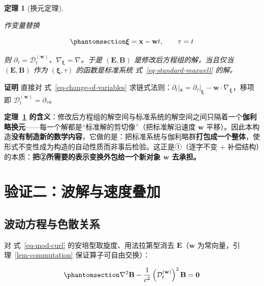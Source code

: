 \documentclass[
  chinese,
  a4paper,
  UTF8,
  12pt,
  oneside,
  openany]{ctexbook}
\theoremstyle{plain}
\newtheorem{theorem}{定理}[chapter]
\theoremstyle{plain}
\theoremstyle{plain}
\theoremstyle{definition}
\theoremstyle{plain}
\theoremstyle{plain}
\theoremstyle{remark}
\begin{document}
\begin{theorem}[换元定理]\protect\hypertarget{thm-change-of-variables}{}\label{thm-change-of-variables}

作变量替换

\begin{equation}\protect\phantomsection\label{eq-change-of-variables}{
\boldsymbol{\xi} = \mathbf{x} - \mathbf{w}t,
\qquad
\tau = t
}\end{equation}

则
\(\partial_{\tau} = \mathcal{D}_{t}^{(\mathbf{w})}\)、\(\nabla_{\boldsymbol{\xi}} = \nabla\)。于是
\(\left(\mathbf{E},\mathbf{B}\right)\) 是修改后方程组的解，当且仅当
\(\left(\mathbf{E},\mathbf{B}\right)\) 作为
\(\left(\boldsymbol{\xi},\tau\right)\) 的函数是标准系统
式~\ref{eq-standard-maxwell} 的解。

\end{theorem}

\textbf{证明} 直接对 式~\ref{eq-change-of-variables}
求链式法则：\(\partial_t|_{\mathbf{x}} = \partial_{\tau}|_{\boldsymbol{\xi}} - \mathbf{w}\cdot\nabla_{\boldsymbol{\xi}}\)，移项即
\(\mathcal{D}_t^{(\mathbf{w})} = \partial_\tau\)。

\textbf{定理~\ref{thm-change-of-variables}
的含义}：修改后方程组的解空间与标准系统的解空间之间只隔着一个\textbf{伽利略换元}------每一个解都是``标准解的剪切像''（把标准解沿速度
\(\mathbf{w}\)
平移）。因此本构造\textbf{没有制造新的数学内容}，它做的是：把标准系统与伽利略群\textbf{打包成一个整体}，使形式不变性成为构造的自动性质而非事后检验。这正是①（逐字不变
+ 补偿结构）的本质：\textbf{把②所需要的表示变换外包给一个新对象
\(\mathbf{w}\) 去承担。}

\section{验证二：波解与速度叠加}\label{sec-gal-wave}

\subsection{波动方程与色散关系}\label{ux6ce2ux52a8ux65b9ux7a0bux4e0eux8272ux6563ux5173ux7cfb}

对 式~\ref{eq-mod-curl} 的安培型取旋度、用法拉第型消去
\(\mathbf{E}\)（\(\mathbf{w}\) 为常向量，引理~\ref{lem-commutation}
保证算子可自由交换）：

\begin{equation}\protect\phantomsection\label{eq-wave-equation}{
\nabla^{2}\mathbf{B} - \frac{1}{c^{2}}\left(\mathcal{D}_{t}^{(\mathbf{w})}\right)^{2}\mathbf{B} = \mathbf{0}
}\end{equation}
\end{document}
